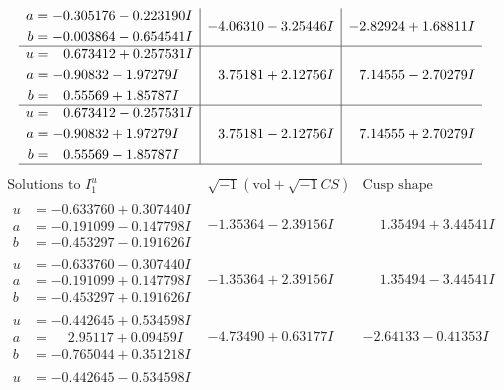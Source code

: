 \documentclass[1p]{elsarticle_modified}
\theoremstyle{definition}
\newcommand{\I}{\sqrt{-1}}
\begin{document}
$$\begin{array}{c|c|c}
\begin{aligned}
a &= -0.305176 - 0.223190 I \\
b &= -0.003864 - 0.654541 I\end{aligned}
 & -4.06310 - 3.25446 I & -2.82924 + 1.68811 I \\ \hline\begin{aligned}
u &= \phantom{-}0.673412 + 0.257531 I \\
a &= -0.90832 - 1.97279 I \\
b &= \phantom{-}0.55569 + 1.85787 I\end{aligned}
 & \phantom{-}3.75181 + 2.12756 I & \phantom{-}7.14555 - 2.70279 I \\ \hline\begin{aligned}
u &= \phantom{-}0.673412 - 0.257531 I \\
a &= -0.90832 + 1.97279 I \\
b &= \phantom{-}0.55569 - 1.85787 I\end{aligned}
 & \phantom{-}3.75181 - 2.12756 I & \phantom{-}7.14555 + 2.70279 I\\
 \hline 
 \end{array}$$\newpage$$\begin{array}{c|c|c}  
\text{Solutions to }I^u_{1}& \I (\text{vol} + \sqrt{-1}CS) & \text{Cusp shape}\\
 \hline 
\begin{aligned}
u &= -0.633760 + 0.307440 I \\
a &= -0.191099 - 0.147798 I \\
b &= -0.453297 - 0.191626 I\end{aligned}
 & -1.35364 - 2.39156 I & \phantom{-}1.35494 + 3.44541 I \\ \hline\begin{aligned}
u &= -0.633760 - 0.307440 I \\
a &= -0.191099 + 0.147798 I \\
b &= -0.453297 + 0.191626 I\end{aligned}
 & -1.35364 + 2.39156 I & \phantom{-}1.35494 - 3.44541 I \\ \hline\begin{aligned}
u &= -0.442645 + 0.534598 I \\
a &= \phantom{-}2.95117 + 0.09459 I \\
b &= -0.765044 + 0.351218 I\end{aligned}
 & -4.73490 + 0.63177 I & -2.64133 - 0.41353 I \\ \hline\begin{aligned}
u &= -0.442645 - 0.534598 I \\

\end{aligned}
\end{array}$$
\end{document}
